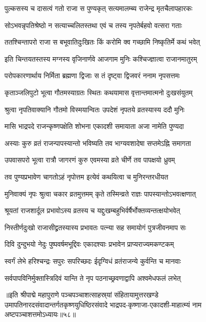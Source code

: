\twolineshloka
{पुल्कसस्य च दासत्वं गतो राजा स पुण्यकृत्}
{सत्यमालम्ब्य राजेन्द्र मृतचैलापहारकः}%

\twolineshloka
{सोऽभवन्नृपतिश्रेष्ठो न सत्याच्चलितस्तथा}
{एवं च तस्य नृपतेर्बहवो वत्सरा गताः}%

\twolineshloka
{ततश्चिन्तापरो राजा स बभूवातिदुःखितः}
{किं करोमि क्व गच्छामि निष्कृतिर्मे कथं भवेत्}%

\twolineshloka
{इति चिन्तयतस्तस्य मग्नस्य वृजिनार्णवे}
{आजगाम मुनिः कश्चिज्ज्ञात्वा राजानमातुरम्}%

\twolineshloka
{परोपकारणार्थाय निर्मिता ब्रह्मणा द्विजाः}
{स तं दृष्ट्वा द्विजवरं ननाम नृपसत्तमः}%

\twolineshloka
{कृताञ्जलिपुटो भूत्वा गौतमस्याग्रतः स्थितः}
{कथयामास वृत्तान्तमात्मनो दुःखसंयुतम्}%

\twolineshloka
{श्रुत्वा नृपतिवाक्यानि गौतमो विस्मयान्वितः}
{उपदेशं नृपतये व्रतस्यास्य ददौ मुनिः}%

\twolineshloka
{मासि भाद्रपदे राजन्कृष्णपक्षेति शोभना}
{एकादशी समायाता  अजा नामेति पुण्यदा}%

\twolineshloka
{अस्याः कुरु व्रतं राजन्पापस्यान्तो भविष्यति}
{तव भाग्यवशादेषा सप्तमेऽह्नि समागता}%

\twolineshloka
{उपवासपरो भूत्वा रात्रौ जागरणं कुरु}
{एवमस्या व्रते चीर्णे तव पापक्षयो ध्रुवम्}%

\twolineshloka
{तव पुण्यप्रभावेण चागतोऽहं नृपोत्तम}
{इत्येवं कथयित्वा च मुनिरन्तरधीयत}%

\twolineshloka
{मुनिवाक्यं नृपः श्रुत्वा चकार व्रतमुत्तमम्}
{कृते तस्मिन्व्रते राज्ञः पापस्यान्तोऽभवत्क्षणात्}%

\twolineshloka
{श्रूयतां राजशार्दूल प्रभावोऽस्य व्रतस्य च}
{यद्दुःखम्बहुभिर्वर्षैर्भोक्तव्यन्तत्क्षयोभवेत्}%

\twolineshloka
{निस्तीर्णदुःखो राजासीद्व्रतस्यास्य प्रभावतः}
{पत्न्या सह समायोगं पुत्रजीवनमाप सः}%

\twolineshloka
{दिवि दुन्दुभयो नेदुः पुष्पवर्षमभूद्दिवः}
{एकादश्याः प्रभावेन प्राप्यराज्यमकण्टकम्}%

\twolineshloka
{स्वर्गं लेभे हरिश्चन्द्रः सपुरः सपरिच्छदः}
{ईदृग्विधं व्रतंराजन्ये कुर्वन्ति च मानवाः}%

\twolineshloka
{सर्वपापविनिर्मुक्तास्त्रिदिवं यान्ति ते नृप}
{पठनाच्छ्रवणाद्वापि अश्वमेधफलं लभेत्}%

॥इति श्रीपाद्मे महापुराणे पञ्चपञ्चाशत्साहस्र्यां संहितायामुत्तरखण्डे उमापतिनारदसंवादान्तर्गतकृष्णयुधिष्ठिरसंवादे भाद्रपद-कृष्णाजा-एकादशी-माहात्म्यं नाम अष्टपञ्चाशत्तमोऽध्यायः॥५८॥



